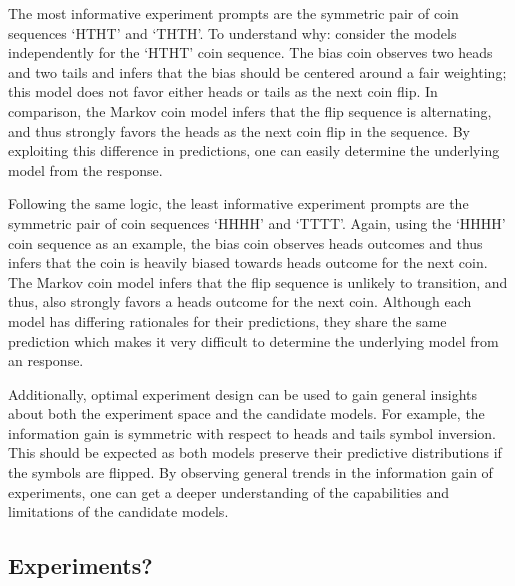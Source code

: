 \documentclass{article}
\begin{document}
The most informative experiment prompts are the symmetric pair of coin sequences `HTHT' and `THTH'. To understand why: consider the models independently for the `HTHT' coin sequence. The bias coin observes two heads and two tails and infers that the bias should be centered around a fair weighting; this model does not favor either heads or tails as the next coin flip. In comparison, the Markov coin model infers that the flip sequence is alternating, and thus strongly favors the heads as the next coin flip in the sequence. By exploiting this difference in predictions, one can easily determine the underlying model from the response.

Following the same logic, the least informative experiment prompts are the symmetric pair of coin sequences `HHHH' and `TTTT'. Again, using the `HHHH' coin sequence as an example, the bias coin observes heads outcomes and thus infers that the coin is heavily biased towards heads outcome for the next coin. The Markov coin model infers that the flip sequence is unlikely to transition, and thus, also strongly favors a heads outcome for the next coin. Although each model has differing rationales for their predictions, they share the same prediction which makes it very difficult to determine the underlying model from an response.

Additionally, optimal experiment design can be used to gain general insights about both the experiment space and the candidate models. For example, the information gain is symmetric with respect to heads and tails symbol inversion. This should be expected as both models preserve their predictive distributions if the symbols are flipped. By observing general trends in the information gain of experiments, one can get a deeper understanding of the capabilities and limitations of the candidate models.

\subsection{Experiments?}
\end{document}
